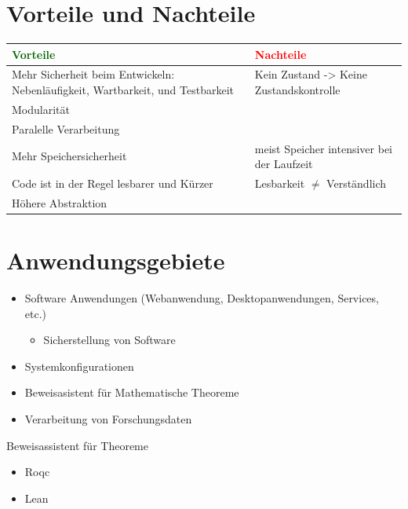 \documentclass{beamer}
\begin{document}
\section{Vorteile und Nachteile}
\begin{frame}
\centering
	\begin{tabular}{ |p{5cm}|p{5cm}|  }
		\hline
             \textcolor{darkgreen}{Vorteile} & \textcolor{red}{Nachteile} \\
		\hline
		Mehr Sicherheit beim Entwickeln: Nebenläufigkeit, Wartbarkeit, und Testbarkeit & Kein Zustand -> Keine Zustandskontrolle \\
            \hline
            Modularität & \\
            Paralelle Verarbeitung& \\
		\hline
            Mehr Speichersicherheit  & meist Speicher intensiver bei der Laufzeit  \\
		\hline
    Code ist in der Regel lesbarer und Kürzer & Lesbarkeit $\neq$ Verständlich \\
            Höhere Abstraktion & \\
		\hline

 \end{tabular}
\end{frame}

\section{Anwendungsgebiete}
\begin{frame}
	\begin{itemize}
            \item Software Anwendungen (Webanwendung, Desktopanwendungen, Services, etc.)
            \begin{itemize}
            \item  Sicherstellung von Software
            \end{itemize}
		\item Systemkonfigurationen
		\item Beweisasistent für Mathematische Theoreme
            \item Verarbeitung von Forschungsdaten
    \end{itemize}
\end{frame}

\begin{frame}{Beweisassistent für Theoreme}
\centering
    \begin{itemize}
        \item  Roqc 
        \item  Lean 
    \end{itemize}

\end{frame}
\end{document}

